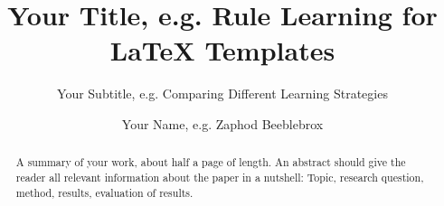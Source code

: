 \documentclass[
thesis%
]{csthes}
\title{Your Title, e.g. Rule Learning for LaTeX Templates}
\subtitle{Your Subtitle, e.g. Comparing Different Learning Strategies}%
\author{Your Name, e.g. Zaphod Beeblebrox \matr{Your Matriculation Number}}
\begin{document}
\maketitle
\begin{abstract}
A summary of your work, about half a page of length. An abstract should give the reader all relevant information about the paper in a nutshell: Topic, research question, method, results, evaluation of results.
\end{abstract}
\tableofcontents%

\listoftables%
\listoffigures%

\mainmatter









\end{document}
